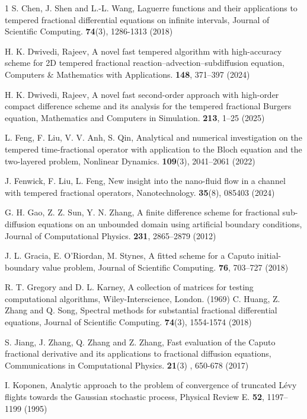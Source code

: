 \documentclass[10pt, reqno]{amsart}
\theoremstyle{remark}
\theoremstyle{definition}
\numberwithin{table}{section}
\begin{document}
\begin{thebibliography}{1}
S. Chen, J. Shen and L.-L. Wang, Laguerre functions and their applications to tempered fractional differential equations on infinite intervals, Journal of Scientific Computing. \textbf{74}(3), 1286-1313 (2018)

H. K. Dwivedi, Rajeev, A novel fast tempered algorithm with high-accuracy scheme for 2D tempered fractional reaction–advection–subdiffusion equation, Computers \& Mathematics with Applications. \textbf{148}, 371--397 (2024)

H. K. Dwivedi, Rajeev, A novel fast second-order approach with high-order compact difference scheme and its analysis for the tempered fractional Burgers equation, Mathematics and Computers in Simulation. \textbf{213}, 1--25 (2025)

L. Feng, F. Liu, V. V. Anh, S. Qin, Analytical and numerical investigation on the tempered time-fractional operator with application to the Bloch equation and the two-layered problem, Nonlinear Dynamics. \textbf{109}(3), 2041--2061 (2022)

J. Fenwick, F. Liu, L. Feng, New insight into the nano-fluid flow in a channel with tempered fractional operators, Nanotechnology. \textbf{35}(8), 085403 (2024)

G. H. Gao, Z. Z. Sun, Y. N. Zhang, A finite difference scheme for fractional sub-diffusion equations on an unbounded domain using artificial boundary conditions, Journal of Computational Physics. \textbf{231}, 2865–2879 (2012)

J. L. Gracia, E. O'Riordan, M. Stynes, A fitted scheme for a Caputo initial-boundary value problem, Journal of Scientific Computing. \textbf{76}, 703--727 (2018)

R. T. Gregory and D. L. Karney, A collection of matrices for testing computational algorithms, Wiley-Interscience, London. (1969)
C. Huang, Z. Zhang and Q. Song, Spectral methods for substantial fractional differential equations, Journal of Scientific Computing.  \textbf{74}(3), 1554-1574 (2018)

S. Jiang, J. Zhang, Q. Zhang and Z. Zhang, Fast evaluation of the Caputo fractional derivative and its applications to fractional diffusion equations,
Communications in Computational Physics.  \textbf{21}(3) , 650-678 (2017)

I. Koponen, Analytic approach to the problem of convergence of truncated Lévy flights towards the Gaussian stochastic process, Physical Review E. \textbf{52}, 1197--1199 (1995)


\end{thebibliography}
\end{document}
